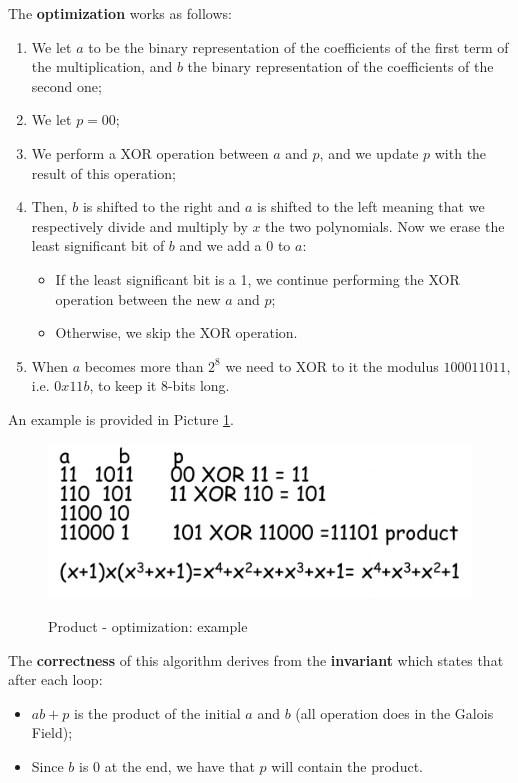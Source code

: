 The \textbf{optimization} works as follows:

\begin{enumerate}
    \item We let $a$ to be the binary representation of the coefficients of the first term of the multiplication, and $b$ the binary representation of the coefficients of the second one;
    \item We let $p = 00$;
    \item We perform a XOR operation between $a$ and $p$, and we update $p$ with the result of this operation;
    \item Then, $b$ is shifted to the right and $a$ is shifted to the left meaning that we respectively divide and multiply by $x$ the two polynomials. Now we erase the least significant bit of $b$ and we add a 0 to $a$:
    \begin{itemize}
        \item If the least significant bit is a 1, we continue performing the XOR operation between the new $a$ and $p$;
        \item Otherwise, we skip the XOR operation. 
    \end{itemize}
    \item When $a$ becomes more than $2^8$ we need to XOR to it the modulus $100011011$, i.e. $0x11b$, to keep it 8-bits long.
\end{enumerate}

An example is provided in Picture \ref{aes8}.

\begin{figure}[h!]
        \centering
        \includegraphics[scale = 0.65]{img/aes8.png}
        \label{aes8}
        \caption{Product - optimization: example}
\end{figure}

The \textbf{correctness} of this algorithm derives from the \textbf{invariant} which states that after each loop: 

\begin{itemize}
    \item $ab+p$ is the product of the initial $a$ and $b$ (all operation does in the Galois Field);
    \item Since $b$ is 0 at the end, we have that $p$ will contain the product.
\end{itemize}

